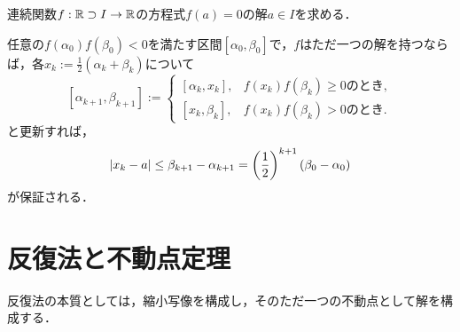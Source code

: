 \documentclass[uplatex, dvipdfmx]{jsreport}
\begin{document}
\begin{problem}
    連続関数$f:\mathbb{R}\supset I\to\mathbb{R}$の方程式$f(a)=0$の解$a\in I$を求める．
\end{problem}
\begin{discussion}[中間値の定理の証明抽出]
    任意の$f(\alpha_0)f(\beta_0)<0$を満たす区間$[\alpha_0,\beta_0]$で，$f$はただ一つの解を持つならば，各$x_k:=\frac{1}{2}(\alpha_k+\beta_k)$について
    \[[\alpha_{k+1},\beta_{k+1}]:=\begin{cases}
        [\alpha_k,x_k],&f(x_k)f(\beta_k)\ge 0のとき,\\
        [x_k,\beta_k],&f(x_k)f(\beta_k)>0のとき.
    \end{cases}\]
    と更新すれば，
    \[\lvert x_k-a\rvert\le\beta_{k+1}-\alpha_{k+1}=\left(\frac{1}{2}\right)^{k+1}(\beta_0-\alpha_0)\]
    が保証される．
\end{discussion}

\section{反復法と不動点定理}

\begin{tcolorbox}[colframe=ForestGreen, colback=ForestGreen!10!white,breakable,colbacktitle=ForestGreen!40!white,coltitle=black,fonttitle=\bfseries\sffamily,
title=]
    反復法の本質としては，縮小写像を構成し，そのただ一つの不動点として解を構成する．
\end{tcolorbox}
\end{document}

